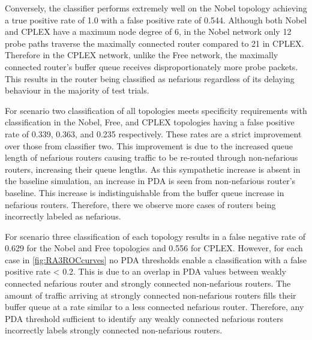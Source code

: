 Conversely, the classifier performs extremely well on the Nobel topology achieving a true positive rate of 1.0 with a false positive rate of 0.544. Although both Nobel and CPLEX have a maximum node degree of 6, in the Nobel network only 12 probe paths traverse the maximally connected router compared to 21 in CPLEX. Therefore in the CPLEX network, unlike the Free network, the maximally connected router's buffer queue receives disproportionately more probe packets. This results in the router being classified as nefarious regardless of its delaying behaviour in the majority of test trials.\par
For scenario two classification of all topologies meets specificity requirements with classification in the Nobel, Free, and CPLEX topologies having a false positive rate of 0.339, 0.363, and 0.235 respectively. These rates are a strict improvement over those from classifier two. This improvement is due to the increased queue length of nefarious routers causing traffic to be re-routed through non-nefarious routers, increasing their queue lengths. As this sympathetic increase is absent in the baseline simulation, an increase in PDA is seen from non-nefarious router's baseline. This increase is indistinguishable from the buffer queue increase in nefarious routers. Therefore, there we observe more cases of routers being incorrectly labeled as nefarious.\par
For scenario three classification of each topology results in a false negative rate of 0.629 for the Nobel and Free topologies and 0.556 for CPLEX. However, for each case in \cref{fig:RA3ROCcurves} no PDA thresholds enable a classification with a false positive rate < 0.2. This is due to an overlap in PDA values between weakly connected nefarious router and strongly connected non-nefarious routers. The amount of traffic arriving at strongly connected non-nefarious routers fills their buffer queue at a rate similar to a less connected nefarious router. Therefore, any PDA threshold sufficient to identify any weakly connected nefarious routers incorrectly labels strongly connected non-nefarious routers.\par

